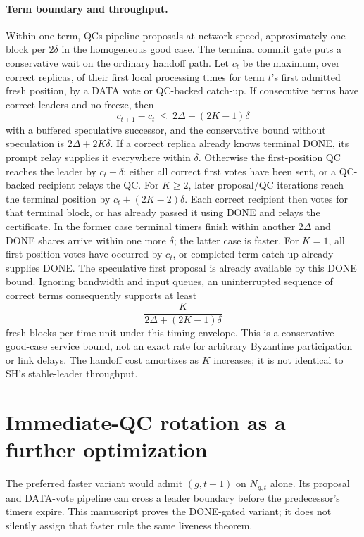 \documentclass[11pt,a4paper]{article}
\begin{document}
\paragraph{Term boundary and throughput.}
Within one term, QCs pipeline proposals at network speed, approximately
one block per $2\delta$ in the homogeneous good case. The terminal commit
gate puts a conservative wait on the ordinary handoff path. Let $c_t$
be the maximum, over correct replicas, of their first local processing
times for term $t$'s first admitted fresh position, by a DATA vote or
QC-backed catch-up.
If consecutive terms have correct leaders and no freeze, then
\[
 c_{t+1}-c_t\ \le\ 2\Delta+(2K-1)\delta
\]
with a buffered speculative successor, and the conservative bound without
speculation is $2\Delta+2K\delta$. If a correct replica already knows
terminal DONE, its prompt relay supplies it everywhere within $\delta$.
Otherwise the first-position QC reaches the leader by $c_t+\delta$:
either all correct first votes have been sent, or a QC-backed recipient
relays the QC. For $K\ge2$, later proposal/QC iterations reach the terminal
position by $c_t+(2K-2)\delta$. Each correct recipient then votes for that
terminal block, or has already passed it using DONE and relays the
certificate. In the former case terminal timers finish within another
$2\Delta$ and DONE shares arrive within one more $\delta$; the latter
case is faster. For $K=1$, all first-position votes have occurred by
$c_t$, or completed-term catch-up already supplies DONE.
The speculative first proposal is already available by this DONE bound.
Ignoring bandwidth and input queues, an uninterrupted sequence of correct
terms consequently supports at least
\[
 \frac{K}{2\Delta+(2K-1)\delta}
\]
fresh blocks per time unit under this timing envelope.
This is a conservative good-case service bound, not an exact rate for
arbitrary Byzantine participation or link delays. The handoff cost
amortizes as $K$ increases; it is not identical to SH's stable-leader
throughput.

\section{Immediate-QC rotation as a further optimization}
\label{sec:optimization}
The preferred faster variant would admit $(g,t+1)$ on $N_{g,t}$ alone.
Its proposal and DATA-vote pipeline can cross a leader boundary before
the predecessor's timers expire. This manuscript proves the DONE-gated
variant; it does not silently assign that faster rule the same liveness theorem.
\end{document}
